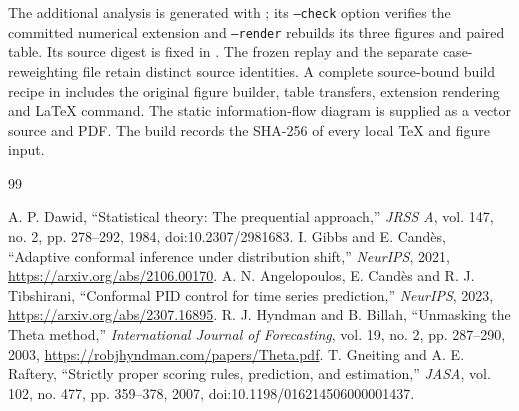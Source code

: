 \documentclass[11pt,a4paper]{article}
\begin{document}
The additional analysis is generated with ; its \texttt{--check} option verifies the committed numerical extension and \texttt{--render} rebuilds its three figures and paired table. Its source digest is fixed in . The frozen replay and the separate case-reweighting file retain distinct source identities. A complete source-bound build recipe in  includes the original figure builder, table transfers, extension rendering and LaTeX command. The static information-flow diagram is supplied as a vector source and PDF. The build records the SHA-256 of every local TeX and figure input.



\begin{thebibliography}{99}

 A. P. Dawid, ``Statistical theory: The prequential approach,'' \emph{JRSS A}, vol. 147, no. 2, pp. 278--292, 1984, doi:10.2307/2981683.
 I. Gibbs and E. Cand\`es, ``Adaptive conformal inference under distribution shift,'' \emph{NeurIPS}, 2021, \url{https://arxiv.org/abs/2106.00170}.
 A. N. Angelopoulos, E. Cand\`es and R. J. Tibshirani, ``Conformal PID control for time series prediction,'' \emph{NeurIPS}, 2023, \url{https://arxiv.org/abs/2307.16895}.
 R. J. Hyndman and B. Billah, ``Unmasking the Theta method,'' \emph{International Journal of Forecasting}, vol. 19, no. 2, pp. 287--290, 2003, \url{https://robjhyndman.com/papers/Theta.pdf}.
 T. Gneiting and A. E. Raftery, ``Strictly proper scoring rules, prediction, and estimation,'' \emph{JASA}, vol. 102, no. 477, pp. 359--378, 2007, doi:10.1198/016214506000001437.
\end{thebibliography}
\end{document}
